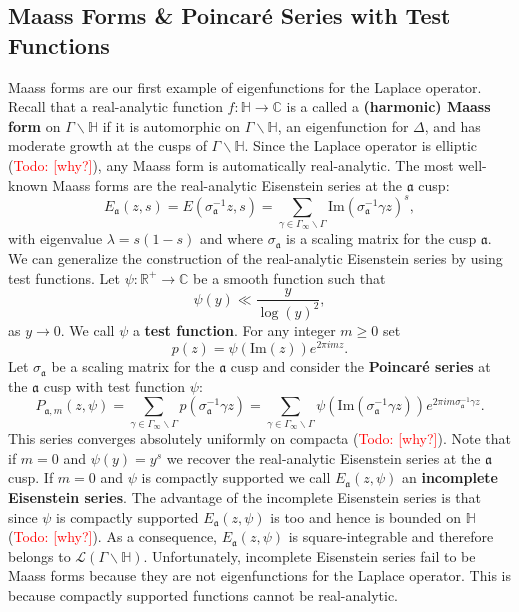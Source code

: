 \documentclass[12pt]{book}
\theoremstyle{definition}\newframedtheorem{method}{Method}
\newcommand{\mf}{\mathfrak}
\newcommand{\mc}{\mathcal}
\newcommand{\R}{\mathbb{R}}
\newcommand{\C}{\mathbb{C}}
\renewcommand{\H}{\mathbb{H}}
\newcommand{\g}{\gamma}
\renewcommand{\l}{\lambda}
\newcommand{\s}{\sigma}
\newcommand{\G}{\Gamma}
\newcommand{\D}{\Delta}
\newcommand{\<}{\langle}
\renewcommand{\>}{\rangle}
\renewcommand{\Im}{\mathrm{Im}}
\newcommand{\GH}{\G\backslash\H}
\newcommand{\GG}{\G_{\infty}\backslash\G}
\newcommand{\todo}[1]{\textcolor{red}{\sf Todo: [#1]}}
\begin{document}
    \subsection*{Maass Forms \& Poincar\'e Series with Test Functions}
      Maass forms are our first example of eigenfunctions for the Laplace operator. Recall that a real-analytic function $f:\H \to \C$ is a called a \textbf{(harmonic) Maass form} on $\GH$ if it is automorphic on $\GH$, an eigenfunction for $\D$, and has moderate growth at the cusps of $\GH$. Since the Laplace operator is elliptic (\todo{why?}), any Maass form is automatically real-analytic. The most well-known Maass forms are the real-analytic Eisenstein series at the $\mf{a}$ cusp:
      \[
        E_{\mf{a}}(z,s) = E(\s_{\mf{a}}^{-1}z,s) = \sum_{\g \in \GG}\Im(\s_{\mf{a}}^{-1}\g z)^{s},
      \]
      with eigenvalue $\l = s(1-s)$ and where $\s_{\mf{a}}$ is a scaling matrix for the cusp $\mf{a}$. We can generalize the construction of the real-analytic Eisenstein series by using test functions. Let $\psi:\R^{+} \to \C$ be a smooth function such that
      \[
        \psi(y) \ll \frac{y}{\log(y)^{2}},
      \]
      as $y \to 0$. We call $\psi$ a \textbf{test function}. For any integer $m \ge 0$ set
      \[
        p(z) = \psi(\Im(z))e^{2\pi imz}.
      \]
      Let $\s_{\mf{a}}$ be a scaling matrix for the $\mf{a}$ cusp and consider the \textbf{Poincar\'e series} at the $\mf{a}$ cusp with test function $\psi$:
      \[
        P_{\mf{a},m}(z,\psi) = \sum_{\g \in \GG}p(\s_{\mf{a}}^{-1}\g z) = \sum_{\g \in \GG}\psi(\Im(\s_{\mf{a}}^{-1}\g z))e^{2\pi im\s_{\mf{a}}^{-1}\g z}.
      \]
      This series converges absolutely uniformly on compacta (\todo{why?}). Note that if $m = 0$ and $\psi(y) = y^{s}$ we recover the real-analytic Eisenstein series at the $\mf{a}$ cusp. If $m = 0$ and $\psi$ is compactly supported we call $E_{\mf{a}}(z,\psi)$ an \textbf{incomplete Eisenstein series}. The advantage of the incomplete Eisenstein series is that since $\psi$ is compactly supported $E_{\mf{a}}(z,\psi)$ is too and hence is bounded on $\H$ (\todo{why?}). As a consequence, $E_{\mf{a}}(z,\psi)$ is square-integrable and therefore belongs to $\mc{L}(\GH)$. Unfortunately, incomplete Eisenstein series fail to be Maass forms because they are not eigenfunctions for the Laplace operator. This is because compactly supported functions cannot be real-analytic.
\end{document}
